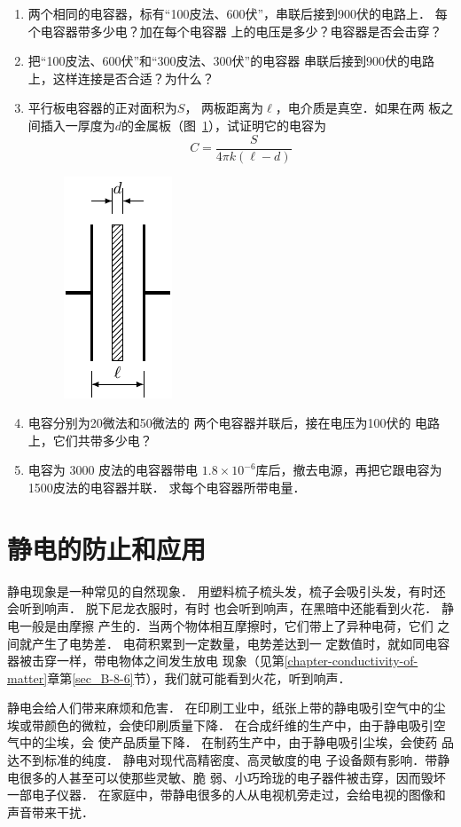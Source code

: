 \begin{enumerate}
\item 两个相同的电容器，标有“100皮法、600伏”，串联后接到900伏的电路上．
每个电容器带多少电？加在每个电容器
上的电压是多少？电容器是否会击穿？
\item 把“100皮法、600伏”和“300皮法、300伏”的电容器
串联后接到900伏的电路上，这样连接是否合适？为什么？
\item 平行板电容器的正对面积为$S$，
两板距离为$\ell$，电介质是真空．如果在两
板之间插入一厚度为$d$的金属板（图~\ref{fig_B_6-42}），试证明它的电容为
\[C=\frac{S}{4\pi k(\ell-d)}\]
\begin{figure}[htbp]
    \centering
    \includegraphics{fig/B/6-42.pdf}
    \caption{}\label{fig_B_6-42}
\end{figure}
\item 电容分别为20微法和50微法的
两个电容器并联后，接在电压为100伏的
电路上，它们共带多少电？
\item 电容为 3000 皮法的电容器带电
$1.8\times10^{-6}$库后，撤去电源，再把它跟电容为1500皮法的电容器并联．
求每个电容器所带电量．
\end{enumerate}

\section{静电的防止和应用}
静电现象是一种常见的自然现象．
用塑料梳子梳头发，梳子会吸引头发，有时还会听到响声．
脱下尼龙衣服时，有时
也会听到响声，在黑暗中还能看到火花．
静电一般是由摩擦
产生的．当两个物体相互摩擦时，它们带上了异种电荷，它们
之间就产生了电势差．
电荷积累到一定数量，电势差达到一
定数值时，就如同电容器被击穿一样，带电物体之间发生放电
现象（见第\ref{chapter-conductivity-of-matter}章第\ref{sec_B-8-6}节），我们就可能看到火花，听到响声．

静电会给人们带来麻烦和危害．
在印刷工业中，纸张上带的静电吸引空气中的尘埃或带颜色的微粒，会使印刷质量下降．
在合成纤维的生产中，由于静电吸引空气中的尘埃，会
使产品质量下降．
在制药生产中，由于静电吸引尘埃，会使药
品达不到标准的纯度．
静电对现代高精密度、高灵敏度的电
子设备颇有影响．带静电很多的人甚至可以使那些灵敏、脆
弱、小巧玲珑的电子器件被击穿，因而毁坏一部电子仪器．
在家庭中，带静电很多的人从电视机旁走过，会给电视的图像和
声音带来干扰．

